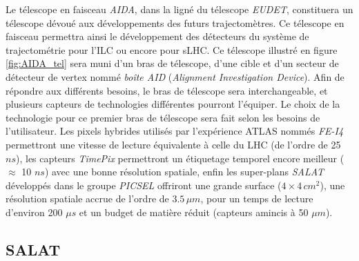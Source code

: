  \medskip

 Le t\'elescope en faisceau \textit{AIDA}, dans la lign\'e du télescope \textit{EUDET}, constituera un t\'elescope d\'evou\'e aux d\'eveloppements des futurs trajectom\`etres. Ce télescope en faisceau permettra ainsi le développement des d\'etecteurs du syst\`eme de trajectom\'etrie pour l'ILC ou encore pour sLHC. Ce t\'elescope illustr\'e en figure \ref{fig:AIDA_tel} sera muni d'un bras de télescope, d'une cible et d'un secteur de d\'etecteur de vertex nomm\'e \textit{boîte AID} (\textit{Alignment Investigation Device}). Afin de r\'epondre aux diff\'erents besoins, le bras de télescope sera interchangeable, et plusieurs capteurs de technologies diff\'erentes pourront l'\'equiper. Le choix de la technologie pour ce premier bras de t\'elescope sera fait selon les besoins de l'utilisateur. Les pixels hybrides utilis\'es par l'exp\'erience ATLAS nomm\'es \textit{FE-I4} permettront une vitesse de lecture équivalente \`a celle du LHC (de l'ordre de 25 $ns$), les capteurs \textit{TimePix} permettront un \'etiquetage temporel encore meilleur ($\approx$ 10 $ns$) avec une bonne r\'esolution spatiale, enfin les super-plans \textit{SALAT} d\'eveloppés dans le groupe \textit{PICSEL} offriront une grande surface ($4 \times 4 \, cm^2$), une r\'esolution spatiale accrue de l'ordre de $3.5 \, \mu m$, pour un temps de lecture d'environ 200 $\mu s$ et un budget de mati\`ere r\'eduit (capteurs amincis \`a 50 $\mu m$).

% 

  \subsection{SALAT}

